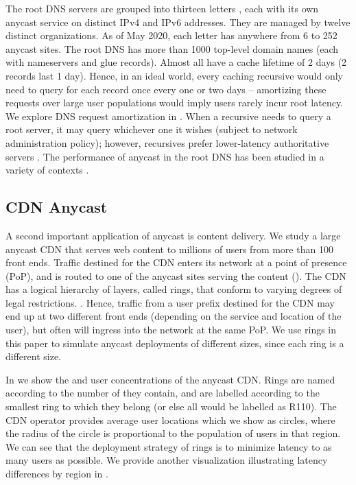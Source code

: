 \documentclass[sigconf,letterpaper,nonacm,10pt,anonymous]{acmart}
\begin{document}
The root DNS servers are grouped into thirteen letters
\cite{root_servers}, each with its own anycast service on distinct IPv4
and IPv6 addresses. They are managed by twelve distinct organizations.
As of May 2020, each letter has anywhere from 6 to 252 anycast sites.
The root DNS has more than 1000 top-level domain names (each with
nameservers and glue records). Almost all have a cache lifetime of 2
days (2 records last 1 day). Hence, in an ideal world, every caching
recursive would only need to query for each record once every one or two
days -- amortizing these requests over large user populations would
imply users rarely incur root latency. We explore DNS request
amortization in . When a recursive needs to
query a root server, it may query whichever one it wishes (subject to
network administration policy); however, recursives prefer lower-latency
authoritative servers \cite{yu2012authority, Mueller17b}. The
performance of anycast in the root DNS has been studied in a variety of
contexts
\cite{colitti2006evaluating, moura2016anycast, de2017anycast, li_levin_spring_bhattacharjee_2018, mcquistin2019taming}.

\subsection{CDN Anycast}\label{cdn-anycast-1}

\label{sec:bg_cdn_anycast}

A second important application of anycast is content delivery. We study
a large anycast CDN that serves web content to millions of users from
more than 100 front ends. Traffic destined for the CDN enters its
network at a point of presence (PoP), and is routed to one of the
anycast sites serving the content (\feplural). The CDN has a logical
hierarchy of layers, called rings, that conform to varying degrees of
legal restrictions\ifisanon. \else \cite{jin2019zooming}. \fi Hence,
traffic from a user prefix destined for the CDN may end up at two
different front ends (depending on the service and location of the
user), but often will ingress into the network at the same PoP. We use
rings in this paper to simulate anycast deployments of different sizes,
since each ring is a different size.

In  we show the \feplural and user
concentrations of the anycast CDN. Rings are named according to the
number of \fe they contain, and \capfeplural are labelled according to
the smallest ring to which they belong (or else all \feplural would be
labelled as R110). The CDN operator provides average user locations
which we show as circles, where the radius of the circle is proportional
to the population of users in that region. We can see that the
deployment strategy of rings is to minimize latency to as many users as
possible. We provide another visualization illustrating latency
differences by region in .
\end{document}
